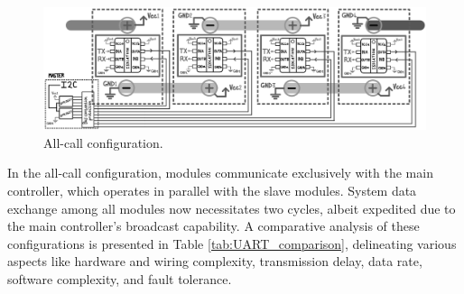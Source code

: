 \begin{figure}[!htb]
\centering
\includegraphics[width=1.0\linewidth]{Figures/AllCall.png}
\caption{All-call configuration.}
\label{fig:allcall}
\end{figure}
\noindent
In the all-call configuration, modules communicate exclusively with the main controller, which operates in parallel with the slave modules. System data exchange among all modules now necessitates two cycles, albeit expedited due to the main controller's broadcast capability.\newline\newline
\noindent
A comparative analysis of these configurations is presented in Table \ref{tab:UART_comparison}, delineating various aspects like hardware and wiring complexity, transmission delay, data rate, software complexity, and fault tolerance.
\newpage
